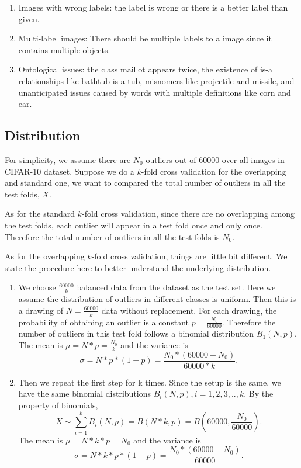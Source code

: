 \begin{enumerate}
\item Images with wrong labels: the label is wrong or there is a better label than given.
\item Multi-label images: There should be multiple labels to a image since it contains multiple objects. 
\item Ontological issues: the class maillot appears twice, the existence of is-a relationships like bathtub is a tub, misnomers like projectile and missile, and unanticipated issues caused by words with multiple definitions like corn and ear. 
\end{enumerate}

\subsection{Distribution}
For simplicity, we assume there are $N_0$ outliers out of 60000 over all images in CIFAR-10 dataset. Suppose we do a $k$-fold cross validation for the overlapping and standard one, we want to compared the total number of outliers in all the test folds, $X$. 

As for the standard $k$-fold cross validation, since there are no overlapping among the test folds, each outlier will appear in a test fold once and only once. Therefore the total number of outliers in all the test folds is $N_0$.

As for the overlapping $k$-fold cross validation, things are little bit different. We state the procedure here to better understand the underlying distribution.
\begin{enumerate}
\item We choose $\frac{60000}{k}$ balanced data from the dataset as the test set. Here we assume the distribution of outliers in different classes is uniform. Then this is a drawing of $N=\frac{60000}{k}$ data without replacement. For each drawing, the probability of obtaining an  outlier is a constant $p=\frac{N_0}{60000}$. Therefore the number of outliers in this test fold follows a binomial distribution $B_1(N,p)$. The mean is $\mu=N*p=\frac{N_0}{k}$ and the variance is $$\sigma=N*p*(1-p)=\frac{N_0*(60000-N_0)}{60000*k}.$$
\item Then we repeat the first step for k times. Since the setup is the same, we have the same binomial distributions $B_i(N,p), i=1,2,3,..,k$. By the property of binomials, $$X \sim \sum_{i=1}^{k}B_i(N,p)=B(N*k,p)=B(60000,\frac{N_0}{60000}).$$ The mean is $\mu=N*k*p=N_0$ and the variance is $$\sigma=N*k*p*(1-p)=\frac{N_0*(60000-N_0)}{60000}.$$
\end{enumerate}

